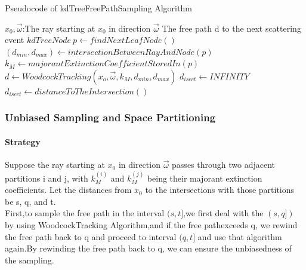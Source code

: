 \documentclass[acmtog]{acmart}
\begin{document}
\begin{algorithm}[h]
	\caption{Pseudocode of kdTreeFreePathSampling Algorithm}
	\begin{algorithmic}[1]
		\Require
		$x_0,\vec{\omega}$:The ray starting at $x_0$ in direction $\vec{\omega}$
		\Ensure
		The free path d to the next scattering event
		\State $kdTreeNode\ p\gets findNextLeafNode()$ 
		\State {} \EndIf
		\State $(d_{min},d_{max})\gets intersectionBetweenRayAndNode(p)$ 
		\State $k_M\gets majorantExtinctionCoefficientStoredIn(p)$ 
		\State $d\gets WoodcockTracking(x_o,\vec{\omega},k_M,d_{min},d_{max})$ 
		\State $d_{isect}\gets INFINITY$
		\State $d_{isect} \gets distanceToTheIntersection()$ \EndIf
		\State {} \EndIf
		\State {} \EndIf
		\EndWhile
	\end{algorithmic}
\end{algorithm}
\subsubsection{Unbiased Sampling and Space Partitioning}
\paragraph{\textbf{Strategy}}
Suppose the ray starting at $x_0$ in direction $\vec{\omega}$ passes through two adjacent partitions i and j, with $k_M^{(i)}$ and $k_M^{(j)}$ being their majorant extinction coefficients. Let the distances from $x_0$ to the intersections with those partitions be s, q, and t.\\
First,to sample the free path in the interval $(s,t]$,we first deal with the $(s,q])$ by using WoodcockTracking Algorithm,and if the free pathexceeds q, we rewind the free path back to q and proceed to interval $(q,t]$ and use that algorithm again.By rewinding the free path back to q, we can ensure the unbiasedness of the sampling.
\end{document}
